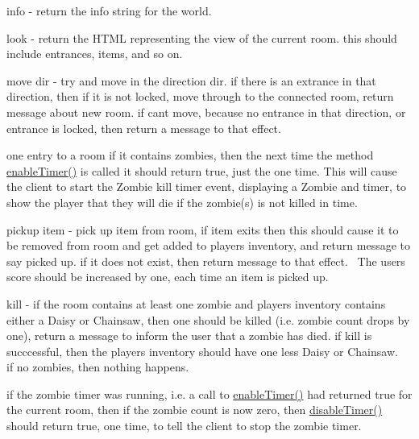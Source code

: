 \begin{DoxyItemize}
\item info -\/ return the info string for the world. 
\item look -\/ return the H\+T\+ML representing the view of the current room. this should include entrances, items, and so on.~\newline
  
\item move dir -\/ try and move in the direction dir. if there is an extrance in that direction, then if it is not locked, move through to the connected room, return message about new room. if can\textquotesingle{}t move, because no entrance in that direction, or entrance is locked, then return a message to that effect.~\newline
  
\item one entry to a room if it contains zombies, then the next time the method \hyperlink{class_zombie_bot_af93d1514656fcf73c9a705fc220c6e5e}{enable\+Timer()} is called it should return true, just the one time. This will cause the client to start the Zombie kill timer event, displaying a Zombie and timer, to show the player that they will die if the zombie(s) is not killed in time.~\newline
  
\item pickup item -\/ pick up item from room, if item exits then this should cause it to be removed from room and get added to players inventory, and return message to say picked up. if it does not exist, then return message to that effect.~\newline
 The users score should be increased by one, each time an item is picked up.  
\item kill -\/ if the room contains at least one zombie and players inventory contains either a Daisy or Chainsaw, then one should be killed (i.\+e. zombie count drops by one), return a message to inform the user that a zombie has died. if kill is succcessful, then the player\textquotesingle{}s inventory should have one less Daisy or Chainsaw.~\newline
 if no zombies, then nothing happens.  
\item if the zombie timer was running, i.\+e. a call to \hyperlink{class_zombie_bot_af93d1514656fcf73c9a705fc220c6e5e}{enable\+Timer()} had returned true for the current room, then if the zombie count is now zero, then \hyperlink{class_zombie_bot_a6078092634dea0a6db55f0377ed3eaa9}{disable\+Timer()} should return true, one time, to tell the client to stop the zombie timer.~\newline
  

\end{DoxyItemize}

